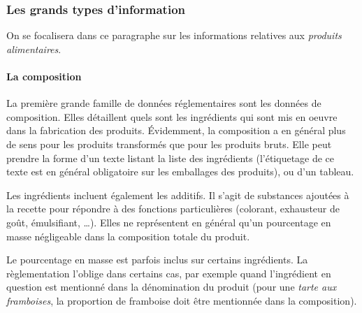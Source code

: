             \subsubsection{Les grands types d'information}
            \label{info_produit}

            On se focalisera dans ce paragraphe sur les informations relatives aux \emph{produits alimentaires}.

                \paragraph{La composition}
                \label{composition}

                La première grande famille de données réglementaires sont les données de composition.
                Elles détaillent quels sont les ingrédients qui sont mis en oeuvre dans la fabrication des produits.
                \'{E}videmment, la composition a en général plus de sens pour les produits transformés que pour les produits bruts.
                Elle peut prendre la forme d'un texte listant la liste des ingrédients (l'étiquetage de ce texte est en général obligatoire sur les emballages des produits), ou d'un tableau.
                
                Les ingrédients incluent également les additifs.
                Il s'agit de substances ajoutées à la recette pour répondre à des fonctions particulières (colorant, exhausteur de goût, émulsifiant, \dots).
                Elles ne représentent en général qu'un pourcentage en masse négligeable dans la composition totale du produit.

                Le pourcentage en masse est parfois inclus sur certains ingrédients. 
                La règlementation l'oblige dans certains cas, par exemple quand l'ingrédient en question est mentionné dans la dénomination du produit (pour une \emph{tarte aux framboises}, la proportion de framboise doit être mentionnée dans la composition).

